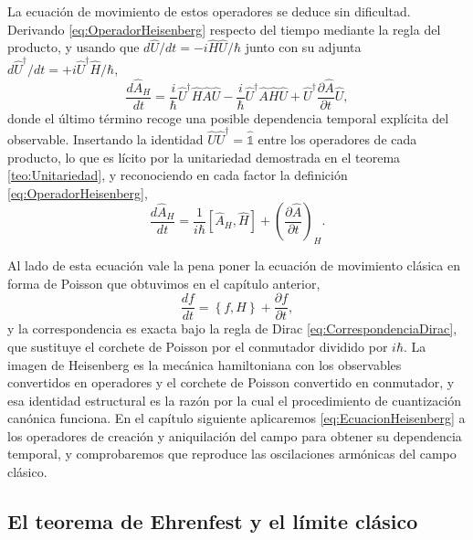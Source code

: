         La ecuación de movimiento de estos operadores se deduce sin dificultad. Derivando \eqref{eq:OperadorHeisenberg} respecto del tiempo mediante la regla del producto, y usando que $d\hat{U}/dt = -i\hat{H}\hat{U}/\hbar$ junto con su adjunta $d\hat{U}^{\dagger}/dt = +i\hat{U}^{\dagger}\hat{H}/\hbar$,
        \begin{equation}\label{eq:DerivadaHeisenberg}
            \frac{d\hat{A}_{H}}{dt} = \frac{i}{\hbar}\hat{U}^{\dagger}\hat{H}\hat{A}\hat{U} - \frac{i}{\hbar}\hat{U}^{\dagger}\hat{A}\hat{H}\hat{U} + \hat{U}^{\dagger}\frac{\partial\hat{A}}{\partial t}\hat{U},
        \end{equation}
        donde el último término recoge una posible dependencia temporal explícita del observable. Insertando la identidad $\hat{U}\hat{U}^{\dagger} = \hat{\mathbb{1}}$ entre los operadores de cada producto, lo que es lícito por la unitariedad demostrada en el teorema \ref{teo:Unitariedad}, y reconociendo en cada factor la definición \eqref{eq:OperadorHeisenberg},
        \begin{equation}\label{eq:EcuacionHeisenberg}
            \boxed{\;\frac{d\hat{A}_{H}}{dt} = \frac{1}{i\hbar}\left[\hat{A}_{H},\hat{H}\right] + \left(\frac{\partial\hat{A}}{\partial t}\right)_{H} .\;}
        \end{equation}

        Al lado de esta ecuación vale la pena poner la ecuación de movimiento clásica en forma de Poisson que obtuvimos en el capítulo anterior,
        \begin{equation}\label{eq:ComparacionPoisson}
            \frac{df}{dt} = \left\{f,H\right\} + \frac{\partial f}{\partial t},
        \end{equation}
        y la correspondencia es exacta bajo la regla de Dirac \eqref{eq:CorrespondenciaDirac}, que sustituye el corchete de Poisson por el conmutador dividido por $i\hbar$. La imagen de Heisenberg es la mecánica hamiltoniana con los observables convertidos en operadores y el corchete de Poisson convertido en conmutador, y esa identidad estructural es la razón por la cual el procedimiento de cuantización canónica funciona. En el capítulo siguiente aplicaremos \eqref{eq:EcuacionHeisenberg} a los operadores de creación y aniquilación del campo para obtener su dependencia temporal, y comprobaremos que reproduce las oscilaciones armónicas del campo clásico.

    \subsection{El teorema de Ehrenfest y el límite clásico}

